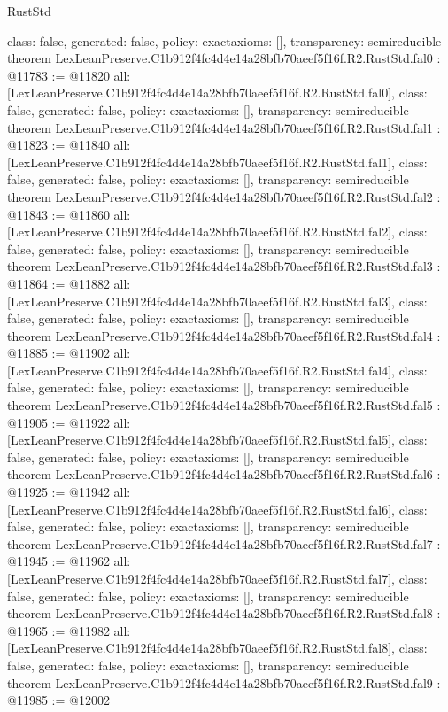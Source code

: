 \begin{lexlean}{RustStd}
\begin{coremodule}
{  class: false,
  generated: false,
  policy: exact{axioms: []},
  transparency: semireducible
}
theorem LexLeanPreserve.C1b912f4fc4d4e14a28bfb70aeef5f16f.R2.RustStd.fal0 : @11783 := @11820 {
  all: [LexLeanPreserve.C1b912f4fc4d4e14a28bfb70aeef5f16f.R2.RustStd.fal0],
  class: false,
  generated: false,
  policy: exact{axioms: []},
  transparency: semireducible
}
theorem LexLeanPreserve.C1b912f4fc4d4e14a28bfb70aeef5f16f.R2.RustStd.fal1 : @11823 := @11840 {
  all: [LexLeanPreserve.C1b912f4fc4d4e14a28bfb70aeef5f16f.R2.RustStd.fal1],
  class: false,
  generated: false,
  policy: exact{axioms: []},
  transparency: semireducible
}
theorem LexLeanPreserve.C1b912f4fc4d4e14a28bfb70aeef5f16f.R2.RustStd.fal2 : @11843 := @11860 {
  all: [LexLeanPreserve.C1b912f4fc4d4e14a28bfb70aeef5f16f.R2.RustStd.fal2],
  class: false,
  generated: false,
  policy: exact{axioms: []},
  transparency: semireducible
}
theorem LexLeanPreserve.C1b912f4fc4d4e14a28bfb70aeef5f16f.R2.RustStd.fal3 : @11864 := @11882 {
  all: [LexLeanPreserve.C1b912f4fc4d4e14a28bfb70aeef5f16f.R2.RustStd.fal3],
  class: false,
  generated: false,
  policy: exact{axioms: []},
  transparency: semireducible
}
theorem LexLeanPreserve.C1b912f4fc4d4e14a28bfb70aeef5f16f.R2.RustStd.fal4 : @11885 := @11902 {
  all: [LexLeanPreserve.C1b912f4fc4d4e14a28bfb70aeef5f16f.R2.RustStd.fal4],
  class: false,
  generated: false,
  policy: exact{axioms: []},
  transparency: semireducible
}
theorem LexLeanPreserve.C1b912f4fc4d4e14a28bfb70aeef5f16f.R2.RustStd.fal5 : @11905 := @11922 {
  all: [LexLeanPreserve.C1b912f4fc4d4e14a28bfb70aeef5f16f.R2.RustStd.fal5],
  class: false,
  generated: false,
  policy: exact{axioms: []},
  transparency: semireducible
}
theorem LexLeanPreserve.C1b912f4fc4d4e14a28bfb70aeef5f16f.R2.RustStd.fal6 : @11925 := @11942 {
  all: [LexLeanPreserve.C1b912f4fc4d4e14a28bfb70aeef5f16f.R2.RustStd.fal6],
  class: false,
  generated: false,
  policy: exact{axioms: []},
  transparency: semireducible
}
theorem LexLeanPreserve.C1b912f4fc4d4e14a28bfb70aeef5f16f.R2.RustStd.fal7 : @11945 := @11962 {
  all: [LexLeanPreserve.C1b912f4fc4d4e14a28bfb70aeef5f16f.R2.RustStd.fal7],
  class: false,
  generated: false,
  policy: exact{axioms: []},
  transparency: semireducible
}
theorem LexLeanPreserve.C1b912f4fc4d4e14a28bfb70aeef5f16f.R2.RustStd.fal8 : @11965 := @11982 {
  all: [LexLeanPreserve.C1b912f4fc4d4e14a28bfb70aeef5f16f.R2.RustStd.fal8],
  class: false,
  generated: false,
  policy: exact{axioms: []},
  transparency: semireducible
}
theorem LexLeanPreserve.C1b912f4fc4d4e14a28bfb70aeef5f16f.R2.RustStd.fal9 : @11985 := @12002 {
}
\end{coremodule}
\end{lexlean}
